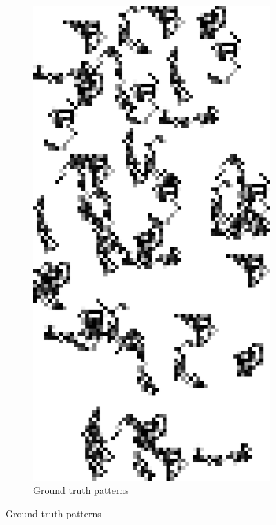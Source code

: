 \documentclass{llncs}
\begin{document}
\begin{figure}
\begin{subfigure}[t]{0.25\textwidth}
\end{subfigure}%
~
\begin{subfigure}[t]{0.25\textwidth}
\centering
\includegraphics[scale=.9]{img/exp_inputpatterns_2.png}
\caption{Ground truth patterns}
\label{fig-example1b}

\end{subfigure}
\end{figure}
\end{document}
